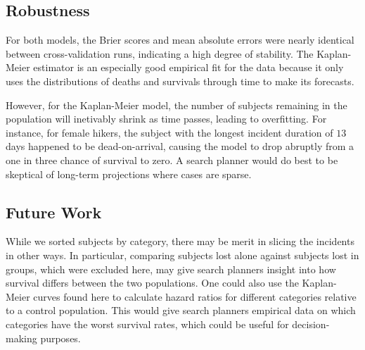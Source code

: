 \documentclass[12pt,titlepage]{article}
\begin{document}
    \subsection{Robustness}
      For both models, the Brier scores and mean absolute errors were nearly
      identical between cross-validation runs, indicating a high degree of
      stability. The Kaplan-Meier estimator is an especially good empirical fit
      for the data because it only uses the distributions of deaths and
      survivals through time to make its forecasts.

      However, for the Kaplan-Meier model, the number of subjects remaining in
      the population will inetivably shrink as time passes, leading to
      overfitting. For instance, for female hikers, the subject with the
      longest incident duration of $13$ days happened to be dead-on-arrival,
      causing the model to drop abruptly from a one in three chance of survival
      to zero. A search planner would do best to be skeptical of long-term
      projections where cases are sparse.

    \subsection{Future Work}
      While we sorted subjects by category, there may be merit in slicing the
      incidents in other ways. In particular, comparing subjects lost alone
      against subjects lost in groups, which were excluded here, may give
      search planners insight into how survival differs between the two
      populations. One could also use the Kaplan-Meier curves found here to
      calculate hazard ratios for different categories relative to a control
      population. This would give search planners empirical data on which
      categories have the worst survival rates, which could be useful for
      decision-making purposes.


  
  
\end{document}
